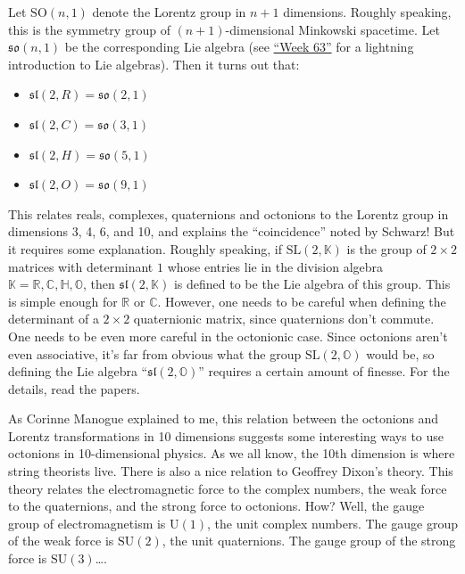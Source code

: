 \documentclass{article}
\def\tightlist{}
\begin{document}
Let \(\mathrm{SO}(n,1)\) denote the Lorentz group in \(n+1\) dimensions.
Roughly speaking, this is the symmetry group of \((n+1)\)-dimensional
Minkowski spacetime. Let \(\mathfrak{so}(n,1)\) be the corresponding Lie
algebra (see \protect\hyperlink{week63}{``Week 63''} for a lightning
introduction to Lie algebras). Then it turns out that:

\begin{itemize}
\tightlist
\item
  \(\mathfrak{sl}(2,R) = \mathfrak{so}(2,1)\)
\item
  \(\mathfrak{sl}(2,C) = \mathfrak{so}(3,1)\)
\item
  \(\mathfrak{sl}(2,H) = \mathfrak{so}(5,1)\)
\item
  \(\mathfrak{sl}(2,O) = \mathfrak{so}(9,1)\)
\end{itemize}

This relates reals, complexes, quaternions and octonions to the Lorentz
group in dimensions 3, 4, 6, and 10, and explains the ``coincidence''
noted by Schwarz! But it requires some explanation. Roughly speaking, if
\(\mathrm{SL}(2,\mathbb{K})\) is the group of \(2\times2\) matrices with
determinant \(1\) whose entries lie in the division algebra
\(\mathbb{K} = \mathbb{R}, \mathbb{C}, \mathbb{H}, \mathbb{O}\), then
\(\mathfrak{sl}(2,\mathbb{K})\) is defined to be the Lie algebra of this
group. This is simple enough for \(\mathbb{R}\) or \(\mathbb{C}\).
However, one needs to be careful when defining the determinant of a
\(2\times2\) quaternionic matrix, since quaternions don't commute. One
needs to be even more careful in the octonionic case. Since octonions
aren't even associative, it's far from obvious what the group
\(\mathrm{SL}(2,\mathbb{O})\) would be, so defining the Lie algebra
``\(\mathfrak{sl}(2,\mathbb{O})\)'' requires a certain amount of
finesse. For the details, read the papers.

As Corinne Manogue explained to me, this relation between the octonions
and Lorentz transformations in 10 dimensions suggests some interesting
ways to use octonions in 10-dimensional physics. As we all know, the
10th dimension is where string theorists live. There is also a nice
relation to Geoffrey Dixon's theory. This theory relates the
electromagnetic force to the complex numbers, the weak force to the
quaternions, and the strong force to octonions. How? Well, the gauge
group of electromagnetism is \(\mathrm{U}(1)\), the unit complex
numbers. The gauge group of the weak force is \(\mathrm{SU}(2)\), the
unit quaternions. The gauge group of the strong force is
\(\mathrm{SU}(3)\)\ldots.
\end{document}
